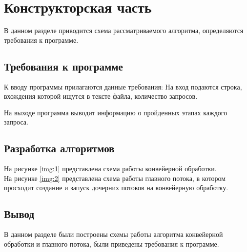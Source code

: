 \chapter{Конструкторская часть}
В данном разделе приводится схема рассматриваемого алгоритма, определяются требования к программе.

\section{Требования к программе}
К вводу программы прилагаются данные требования:
На вход подаются строка, вхождения которой ищутся в тексте файла, количество запросов. 


На выходе программа выводит информацию о пройденных этапах каждого запроса. 
\section{Разработка алгоритмов}

На рисунке \ref{img:1} представлена схема работы конвейерной обработки.\\
На рисунке \ref{img:2} представлена схема работы главного потока, в котором просходит создание и запуск дочерних потоков на конвейерную обработку.\\



\newpage

\section*{Вывод}
В данном разделе были построены схемы работы алгоритма конвейерной обработки и главного потока, были приведены требования к программе.

